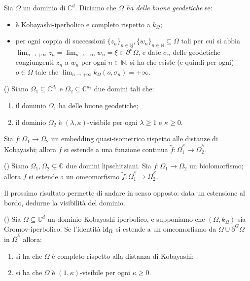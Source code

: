\begin{defn}
    Sia $\Omega$ un dominio di $\mathbb{C}^d$. Diciamo che \textit{$\Omega$ ha delle buone geodetiche} se:
    \begin{itemize}
        \item è Kobayashi-iperbolico e completo rispetto a $k_\Omega$;
        \item per ogni coppia di successioni $\{z_n\}_{n\in\mathbb{N}},\{w_n\}_{n\in\mathbb{N}}\subseteq\Omega$ tali per cui si abbia $\displaystyle\lim_{n\longrightarrow+\infty}z_n=\displaystyle\lim_{n\longrightarrow+\infty}w_n=\xi\in\partial^\mathcal{E}\Omega$, e date $\sigma_n$ delle geodetiche congiungenti $z_n$ a $w_n$ per ogni $n\in\mathbb{N}$, si ha che esiste (e quindi per ogni) $o\in\Omega$ tale che $\displaystyle\lim_{n\longrightarrow+\infty}k_\Omega(o,\sigma_n)=+\infty$.
    \end{itemize}
\end{defn}

\begin{thm}
    (\cite[Theorem 1.6]{BZ2}) Siano $\Omega_1\subseteq\mathbb{C}^{d_1}$ e $\Omega_2\subseteq\mathbb{C}^{d_2}$ due domini tali che:
    \begin{enumerate}[label={(\arabic*)}]
        \item il dominio $\Omega_1$ ha delle buone geodetiche;
        \item il dominio $\Omega_2$ è $(\lambda,\kappa)$-visibile per ogni $\lambda\ge 1$ e $\kappa\ge 0$.
    \end{enumerate}

    Sia $f:\Omega_1\longrightarrow\Omega_2$ un embedding quasi-isometrico rispetto alle distanze di Kobayashi; allora $f$ si estende a una funzione continua $\tilde{f}:\overline{\Omega}_1^\mathcal{E}\longrightarrow\overline{\Omega}_2^\mathcal{E}$.
\end{thm}

\begin{thm}
    (\cite[Theorem 1.9]{BZ2}) Siano $\Omega_1,\Omega_2\subsetneq\mathbb{C}$ due domini lipschitziani. Sia $f:\Omega_1\longrightarrow\Omega_2$ un biolomorfismo; allora $f$ si estende a un omeomorfismo $\tilde{f}:\overline{\Omega}_1^\mathcal{E}\longrightarrow\overline{\Omega}_2^\mathcal{E}$.
\end{thm}

Il prossimo risultato permette di andare in senso opposto: data un estensione al bordo, dedurne la visibilità del dominio.

\begin{thm}
    (\cite[Theorem 1.10]{BZ2}) Sia $\Omega\subseteq\mathbb{C}^d$ un dominio Kobayashi-iperbolico, e supponiamo che $(\Omega,k_\Omega)$ sia Gromov-iperbolico. Se l'identità $\operatorname{id}_\Omega$ si estende a un omeomorfismo da $\Omega\cup\partial^G\Omega$ in $\overline{\Omega}^\mathcal{E}$ allora:
    \begin{enumerate}[label={(\arabic*)}]
        \item si ha che $\Omega$ è completo rispetto alla distanza di Kobayashi;
        \item si ha che $\Omega$ è $(1,\kappa)$-visibile per ogni $\kappa\ge0$.
    \end{enumerate}
\end{thm}

